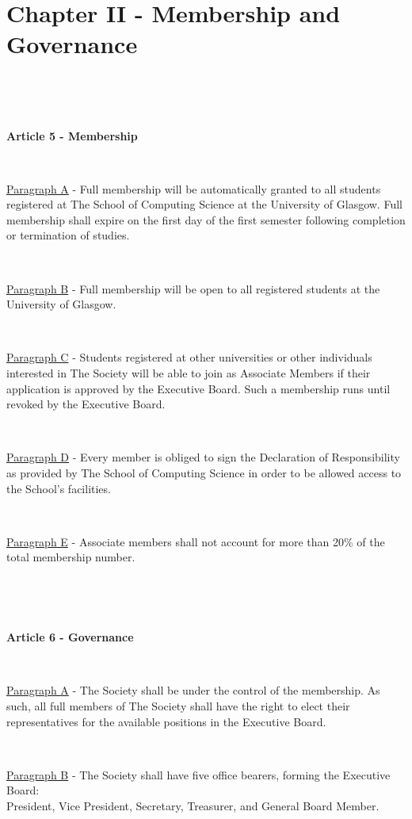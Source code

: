 \section{Chapter II - Membership and Governance}

~

~

\large{\textbf{Article 5 - Membership}}

~

\underline{Paragraph A} - Full membership will be automatically granted
to all students registered at The School of Computing Science at the
University of Glasgow. Full membership shall expire on the first day of the first
semester following completion or termination of studies.

~

\underline{Paragraph B} - Full membership will be open to all registered
students at the University of Glasgow.

~

\underline{Paragraph C} - Students registered at other universities or
other individuals interested in The Society will be able to join as
Associate Members if their application is approved by the Executive Board.
Such a membership runs until revoked by the Executive Board.

~

\underline{Paragraph D} - Every member is obliged to sign the
Declaration of Responsibility as provided by The School of Computing
Science in order to be allowed access to the School's facilities.

~

\underline{Paragraph E} - Associate members shall not account for more
than 20\% of the total membership number.

~

~

\large{\textbf{Article 6 - Governance}}

~

\underline{Paragraph A} - The Society shall be under the control of the
membership. As such, all full members of The Society shall have the
right to elect their representatives for the available positions in the
Executive Board.

~

\underline{Paragraph B} - The Society shall have five office bearers,
forming the Executive Board:\\
President, Vice President, Secretary, Treasurer, and General Board Member.

~


